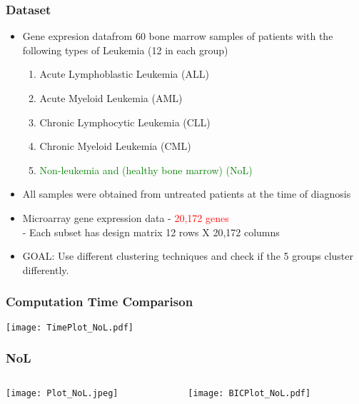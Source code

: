 \documentclass[10pt,dvipsnames,table, handout]{beamer} %
\begin{document}
\begin{frame}
\frametitle{Dataset}
\begin{itemize}
\item Gene expresion data\footnotemark from 60 bone marrow samples of patients with the following types of Leukemia (12 in each group)
\begin{enumerate}
\item Acute Lymphoblastic Leukemia (ALL)
\item Acute Myeloid Leukemia (AML)
\item Chronic Lymphocytic Leukemia (CLL)
\item Chronic Myeloid Leukemia (CML)
\item \textcolor{green}{Non-leukemia and (healthy bone marrow) (NoL)}
\end{enumerate}
\pause \item All samples were obtained from untreated patients at the time of diagnosis
\pause \item Microarray gene expression data - \textcolor{red}{20,172 genes} \\
\hspace{0.5cm} - Each subset has design matrix 12 rows X 20,172 columns
\pause \item GOAL: Use different clustering techniques and check if the 5 groups cluster differently.
\end{itemize}
\end{frame}

\begin{frame}
\frametitle{Computation Time Comparison}
\texttt{[image: TimePlot\_NoL.pdf]}
\end{frame}

\begin{frame}
\frametitle{NoL}
\begin{columns}
\begin{column}{5cm}
\texttt{[image: Plot\_NoL.jpeg]} \\
\end{column}
\begin{column}{5cm}
\pause \texttt{[image: BICPlot\_NoL.pdf]} \\
\end{column}
\end{columns}
\end{frame}
\end{document}
